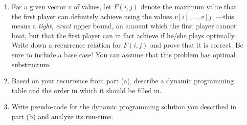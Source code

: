 \documentclass[12pt]{article}
\begin{document}
\begin{enumerate}
	\begin{enumerate}
	\item For a given vector $v$ of values, let $F(i,j)$ denote the maximum value that the first player can definitely achieve using the values $v[i], \dotsc, v[j]$---this means a \emph{tight}, \emph{exact} upper bound, an amount which the first player cannot beat, but that the first player can in fact achieve if he/she plays optimally. Write down a recurrence relation for $F(i,j)$ and prove that it is correct. Be sure to include a base case!  You can assume that this problem has optimal substructure.
	
	\item Based on your recurrence from part (a), describe a dynamic programming table and the order in which it should be filled in.
	
	\item Write pseudo-code for the dynamic programming solution you described in part (b) and analyze its run-time.
	
	\end{enumerate}

\end{enumerate}
\end{document}
